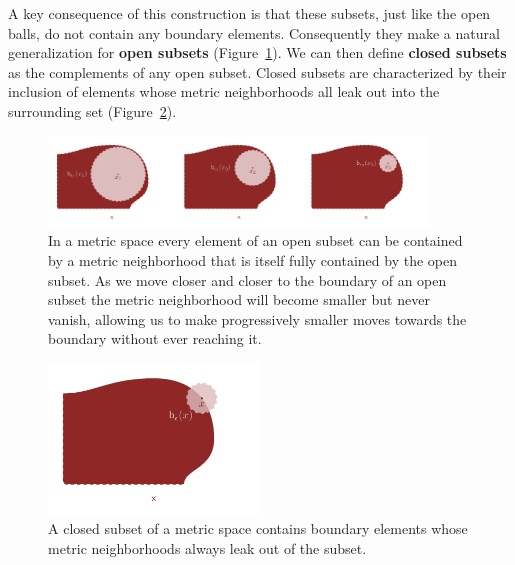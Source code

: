 \documentclass[
  letterpaper,
  DIV=11,
  numbers=noendperiod]{scrartcl}
\begin{document}
A key consequence of this construction is that these subsets, just like
the open balls, do not contain any boundary elements. Consequently they
make a natural generalization for \textbf{open subsets}
(Figure~\ref{fig-open-subset}). We can then define \textbf{closed
subsets} as the complements of any open subset. Closed subsets are
characterized by their inclusion of elements whose metric neighborhoods
all leak out into the surrounding set (Figure~\ref{fig-closed-subset}).

\begin{figure}

{\centering \includegraphics[width=0.9\textwidth,height=\textheight]{figures/structures/metric_topology/open_subset/open_subset.pdf}

}

\caption{\label{fig-open-subset}In a metric space every element of an
open subset can be contained by a metric neighborhood that is itself
fully contained by the open subset. As we move closer and closer to the
boundary of an open subset the metric neighborhood will become smaller
but never vanish, allowing us to make progressively smaller moves
towards the boundary without ever reaching it.}

\end{figure}

\begin{figure}

{\centering \includegraphics[width=0.5\textwidth,height=\textheight]{figures/structures/metric_topology/closed_subset/closed_subset.pdf}

}

\caption{\label{fig-closed-subset}A closed subset of a metric space
contains boundary elements whose metric neighborhoods always leak out of
the subset.}

\end{figure}
\end{document}
